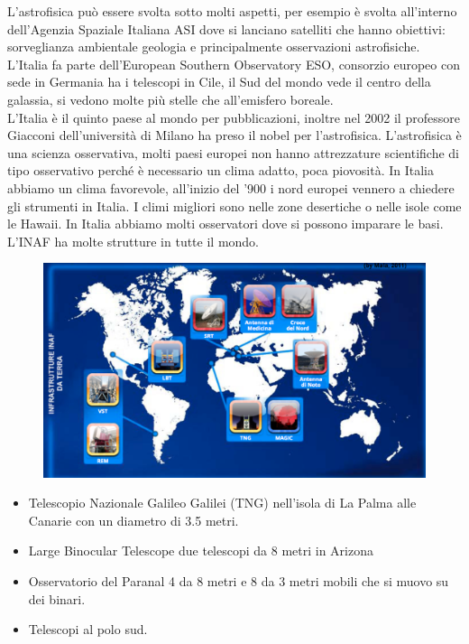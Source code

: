 \documentclass[a4paper,11pt]{article}
\begin{document}
L'astrofisica può essere svolta sotto molti aspetti, per esempio è svolta all'interno dell'Agenzia Spaziale Italiana ASI dove si lanciano satelliti che hanno obiettivi: sorveglianza ambientale geologia e principalmente osservazioni astrofisiche. L'Italia fa parte dell'European Southern Observatory ESO, consorzio europeo con sede in Germania ha i telescopi in Cile, il Sud del mondo vede il centro della galassia, si vedono molte più stelle che all'emisfero boreale.\\
L'Italia è il quinto paese al mondo per pubblicazioni, inoltre nel 2002 il professore Giacconi dell'università di Milano ha preso il nobel per l'astrofisica. L'astrofisica è una scienza osservativa, molti paesi europei non hanno attrezzature scientifiche di tipo osservativo perché è necessario un clima adatto, poca piovosità. In Italia abbiamo un clima favorevole, all'inizio del '900 i nord europei vennero a chiedere gli strumenti in Italia. I climi migliori sono nelle zone desertiche o nelle isole come le Hawaii. In Italia abbiamo molti osservatori dove si possono imparare le basi.\\
L'INAF ha molte strutture in tutte il mondo.
\begin{figure}[ht]
    \centering
    \includegraphics[width=12 cm]{Strutture inaf.png}
\end{figure}
\begin{itemize}
    \item Telescopio Nazionale Galileo Galilei (TNG) nell'isola di La Palma alle Canarie con un diametro di 3.5 metri. 
    \item Large Binocular Telescope due telescopi da 8 metri in Arizona
    \item Osservatorio del Paranal 4 da 8 metri e 8 da 3 metri mobili che si muovo su dei binari.
    \item Telescopi al polo sud.
\end{itemize}
\end{document}

